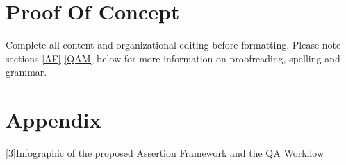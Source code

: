 \documentclass[conference]{IEEEtran}
\begin{document}
\section{Proof Of Concept}

Complete all content and organizational editing before 
formatting. Please note sections \ref{AF}-\ref{QAM} below for more information on 
proofreading, spelling and grammar.




\section*{Appendix}

\noindent\footnotesize{[3]\hspace{0.5em}Infographic of the proposed Assertion Framework and the QA Workflow}
\end{document}
